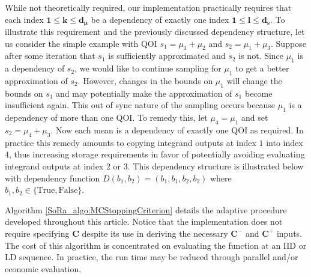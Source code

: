 \documentclass[graybox]{svmult}
\begin{document}
While not theoretically required, our implementation practically requires that each index $\boldsymbol{1} \leq \boldsymbol{k} \leq \boldsymbol{d}_{\boldsymbol{\mu}}$ be a dependency of exactly one index $\boldsymbol{1} \leq \boldsymbol{l} \leq \boldsymbol{d}_{\boldsymbol{s}}$. To illustrate this requirement and the previously discussed dependency structure, let us consider the simple example with QOI $s_1 = \mu_1 + \mu_2$ and $s_2 = \mu_1 + \mu_3$. Suppose after some iteration that $s_1$ is sufficiently approximated and $s_2$ is not. Since $\mu_1$ is a dependency of $s_2$, we would like to continue sampling for $\mu_1$ to get a better approximation of $s_2$. However, changes in the bounds on $\mu_1$ will change the bounds on $s_1$ and may potentially make the approximation of $s_1$ become insufficient again. This out of sync nature of the sampling occurs because $\mu_1$ is a dependency of more than one QOI. To remedy this, let $\mu_4 = \mu_1$ and set $s_2 = \mu_4 + \mu_3$. Now each mean is a dependency of exactly one QOI as required. In practice this remedy amounts to copying integrand outputs at index $1$ into index $4$, thus increasing storage requirements in favor of potentially avoiding evaluating integrand outputs at index $2$ or $3$. This dependency structure is illustrated below with dependency function $D(b_1,b_2) = (b_1,b_1,b_2,b_2)$ where $b_1,b_2 \in \{\text{True},\text{False}\}$. 

\begin{figure}
    \centering
{}
\end{figure}

Algorithm \ref{SoRa_algo:MCStoppingCriterion} details the adaptive procedure developed throughout this article. Notice that the implementation does not require specifying $\boldsymbol{C}$ despite its use in deriving the necessary $\boldsymbol{C}^-$ and $\boldsymbol{C}^+$ inputs. The cost of this algorithm is concentrated on evaluating the function at an IID or LD sequence. In practice, the run time may be reduced through parallel and/or economic evaluation.
\end{document}
